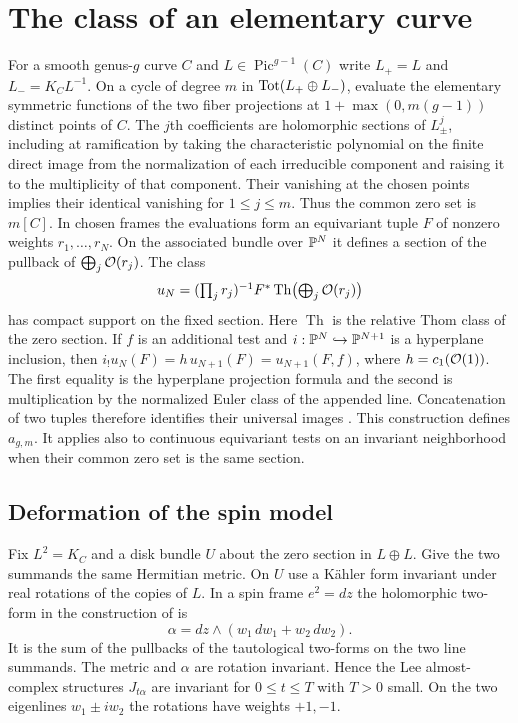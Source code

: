 \section{The class of an elementary curve}\label{sec:local}

For a smooth genus-$g$ curve $C$ and $L\in\operatorname{Pic}^{g-1}(C)$
write $L_+=L$ and $L_-=K_C L^{-1}$. On a cycle of degree $m$ in
$\operatorname{Tot}(L_+\oplus L_-)$, evaluate the elementary symmetric functions of
the two fiber projections at $1+\max(0,m(g-1))$ distinct points of $C$.
The $j$th coefficients are holomorphic sections of $L_\pm^j$, including
at ramification by taking the characteristic polynomial on the finite direct
image from the normalization of each irreducible component and raising
it to the multiplicity of that component. Their vanishing at the chosen points implies
their identical vanishing for $1\le j\le m$. Thus the common zero set is
$m[C]$. In chosen frames the evaluations form an equivariant tuple $F$
of nonzero weights $r_1,\ldots,r_N$. On the associated bundle over
$\mathbb P^N$ it defines a section of the pullback of $\bigoplus_j\mathcal O(r_j)$.
The class
\[
 u_N=(\textstyle\prod_jr_j)^{-1}F^*\operatorname{Th}
                     \bigl(\textstyle\bigoplus_j\mathcal O(r_j)\bigr)
\]
has compact support on the fixed section. Here $\operatorname{Th}$ is
the relative Thom class of the zero section. If $f$ is an additional test and
$i:\mathbb P^N\hookrightarrow\mathbb P^{N+1}$ is a hyperplane inclusion, then
$i_!u_N(F)=h\,u_{N+1}(F)=u_{N+1}(F,f)$, where $h=c_1(\mathcal O(1))$.
The first equality is the hyperplane projection formula and the second
is multiplication by the normalized Euler class of the appended
line. Concatenation of two tuples therefore identifies their universal images
\cite[\S2]{PaperIII}. This construction defines $a_{g,m}$. It applies
also to continuous equivariant tests on an invariant neighborhood when
their common zero set is the same section.

\subsection{Deformation of the spin model}
Fix $L^2=K_C$ and a disk bundle $U$ about the zero section in
$L\oplus L$. Give the two summands the same Hermitian metric. On $U$
use a Kähler form invariant under real rotations of the copies of $L$.
In a spin frame $e^2=dz$ the holomorphic two-form in the construction of
\cite[Proposition~3.2]{IP} is
\[
                  \alpha=dz\wedge(w_1\,dw_1+w_2\,dw_2).
\]
It is the sum of the pullbacks of the tautological two-forms on the
two line summands. The metric and $\alpha$ are rotation invariant.
Hence the Lee almost-complex structures $J_{t\alpha}$ are invariant
for $0\le t\le T$ with $T>0$ small. On the two eigenlines
$w_1\pm iw_2$ the rotations have weights $+1,-1$.

